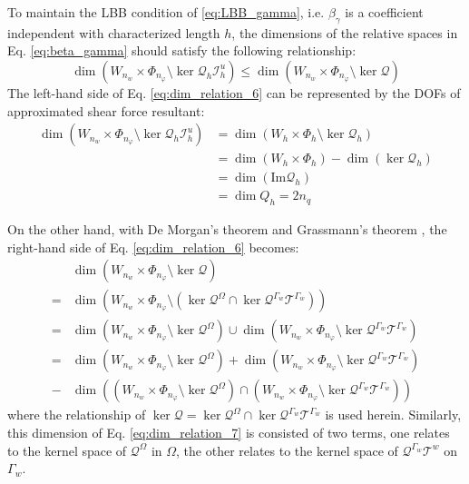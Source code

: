 To maintain the LBB condition of \eqref{eq:LBB_gamma}, i.e. $\beta_\gamma$ is a coefficient independent with characterized length $h$, the dimensions of the relative spaces in Eq. \eqref{eq:beta_gamma} should satisfy the following relationship:
\begin{equation}\label{eq:dim_relation_6}
\dim \left(W_{n_w}\times\Phi_{n_\varphi}\setminus\ker\mathcal Q_h \mathcal I_h^u\right) \le
\dim \left(W_{n_w}\times\Phi_{n_\varphi}\setminus\ker\mathcal Q\right)
\end{equation}
The left-hand side of Eq. \eqref{eq:dim_relation_6} can be represented by the DOFs of approximated shear force resultant:
\begin{equation}
    \begin{split}
        \dim \left(W_{n_w}\times \Phi_{n_\varphi}\setminus\ker\mathcal Q_h\mathcal I_h^u\right)
        &= \dim \left(W_h\times \Phi_h\setminus\ker\mathcal Q_h\right) \\
        &= \dim(W_h\times\Phi_h) - \dim(\ker \mathcal Q_h) \\
        &= \dim(\mathrm{Im} \mathcal Q_h) \\
        &= \dim Q_h = 2n_q
    \end{split}
\end{equation}

On the other hand, with De Morgan's theorem and Grassmann's theorem \cite{}, the right-hand side of Eq. \eqref{eq:dim_relation_6} becomes:
\begin{equation}\label{eq:dim_relation_7}
    \begin{split}
        &\dim(W_{n_w}\times\Phi_{n_\varphi}\setminus\ker\mathcal Q) \\
        =&\dim \left(W_{n_w}\times\Phi_{n_\varphi}\setminus (\ker\mathcal Q^\Omega\cap\ker\mathcal Q^{\Gamma_w}\mathcal T^{\Gamma_w})\right) \\
        =&\dim\left(W_{n_w}\times\Phi_{n_\varphi} \setminus \ker \mathcal Q^\Omega\right)
        \cup 
        \dim\left(W_{n_w}\times\Phi_{n_\varphi}\setminus \ker \mathcal Q^{\Gamma_w}\mathcal T^{\Gamma_w}\right) \\
        =& \dim\left(W_{n_w}\times\Phi_{n_\varphi}\setminus\ker \mathcal Q^\Omega\right)
        +\dim\left(W_{n_w}\times\Phi_{n_\varphi}\setminus \ker \mathcal Q^{\Gamma_w}\mathcal T^{\Gamma_w}\right) \\
        -&\dim\left((W_{n_w}\times\Phi_{n_\varphi}\setminus\ker \mathcal Q^\Omega)\cap (W_{n_w}\times\Phi_{n_\varphi}\setminus \ker \mathcal Q^{\Gamma_w}\mathcal T^{\Gamma_w})\right)
    \end{split}
\end{equation}
where the relationship of $\ker \mathcal Q = \ker \mathcal Q^\Omega \cap \ker \mathcal Q^{\Gamma_w}\mathcal T^{\Gamma_w}$ is used herein.
Similarly, this dimension of Eq. \eqref{eq:dim_relation_7} is consisted of two terms, one relates to the kernel space of $\mathcal Q^\Omega$ in $\Omega$, the other relates to the kernel space of $\mathcal Q^{\Gamma_w}\mathcal T^w$ on $\Gamma_w$.

